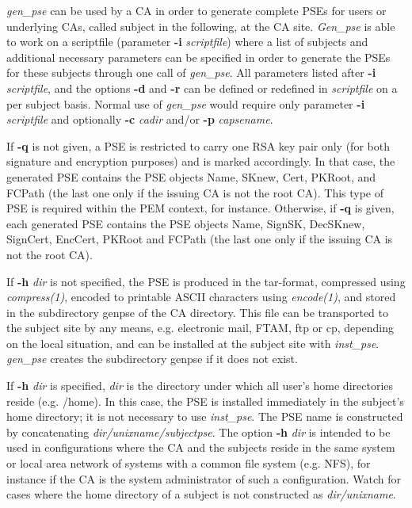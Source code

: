 {\em gen\_pse} can be used by a CA in order to generate complete PSEs for users or underlying CAs,
called subject in the following, at the CA site. {\em Gen\_pse} is able to work on a scriptfile
(parameter {\bf -i} {\em scriptfile}) where a list of subjects and additional necessary
parameters can be specified in order to generate the PSEs for these subjects through one
call of {\em gen\_pse}. All parameters listed after {\bf -i} {\em scriptfile}, and the
options {\bf -d} and {\bf -r} can be defined or redefined in {\em scriptfile} on a per subject
basis. Normal use of {\em gen\_pse} would require only parameter {\bf -i} {\em scriptfile}
and optionally {\bf -c} {\em cadir} and/or {\bf -p} {\em capsename}.

If {\bf -q} is not given, a PSE is restricted to carry one RSA key pair only (for both signature and encryption 
purposes)
and is marked accordingly. In that case, the generated PSE contains the PSE objects Name, SKnew, Cert, 
PKRoot, and FCPath
(the last one only if the issuing CA is not the root CA). This type of PSE is required within the PEM context, 
for instance.
Otherwise, if {\bf -q} is given, each generated PSE contains the PSE objects Name, SignSK, DecSKnew, 
SignCert,
EncCert, PKRoot and FCPath (the last one only if the issuing CA is not the root CA).

If {\bf -h} {\em dir} is not specified, the PSE is produced in the tar-format, compressed
using {\em compress(1)}, encoded to printable ASCII characters using {\em encode(1)}, and
stored in the subdirectory genpse of the CA directory. This file can be transported
to the subject site by any means, e.g. electronic mail, FTAM, ftp or cp, depending on
the local situation, and can be installed at the subject site with {\em inst\_pse}. 
{\em gen\_pse} creates the subdirectory genpse if it does not exist.

If {\bf -h} {\em dir} is specified, {\em dir} is the directory under which all user's
home directories reside (e.g. /home). In this case, the PSE is installed immediately
in the subject's home directory; it is not necessary to use {\em inst\_pse}.
The PSE name is constructed by concatenating {\em dir/unixname/subjectpse}. The
option {\bf -h} {\em dir} is intended to be used in configurations where the CA and
the subjects reside in the same system or local area network of systems with a common
file system (e.g. NFS), for instance if the CA is the system administrator of such
a configuration. Watch for cases where the home directory of a subject is not constructed
as {\em dir/unixname}.

